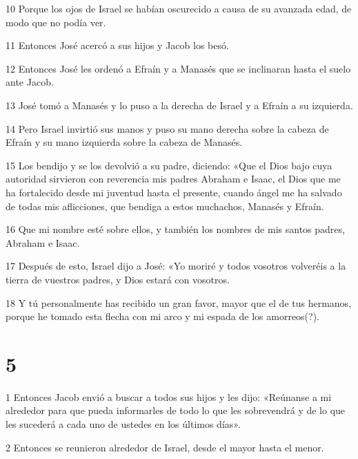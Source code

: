 \par 10 Porque los ojos de Israel se habían oscurecido a causa de su avanzada edad, de modo que no podía ver.

\par 11 Entonces José acercó a sus hijos y Jacob los besó.

\par 12 Entonces José les ordenó a Efraín y a Manasés que se inclinaran hasta el suelo ante Jacob.

\par 13 José tomó a Manasés y lo puso a la derecha de Israel y a Efraín a su izquierda.

\par 14 Pero Israel invirtió sus manos y puso su mano derecha sobre la cabeza de Efraín y su mano izquierda sobre la cabeza de Manasés.

\par 15 Los bendijo y se los devolvió a su padre, diciendo: «Que el Dios bajo cuya autoridad sirvieron con reverencia mis padres Abraham e Isaac, el Dios que me ha fortalecido desde mi juventud hasta el presente, cuando ángel me ha salvado de todas mis aflicciones, que bendiga a estos muchachos, Manasés y Efraín.

\par 16 Que mi nombre esté sobre ellos, y también los nombres de mis santos padres, Abraham e Isaac.

\par 17 Después de esto, Israel dijo a José: «Yo moriré y todos vosotros volveréis a la tierra de vuestros padres, y Dios estará con vosotros.

\par 18 Y tú personalmente has recibido un gran favor, mayor que el de tus hermanos, porque he tomado esta flecha con mi arco y mi espada de los amorreos(?).

\chapter{5}

\par 1 Entonces Jacob envió a buscar a todos sus hijos y les dijo: «Reúnanse a mi alrededor para que pueda informarles de todo lo que les sobrevendrá y de lo que les sucederá a cada uno de ustedes en los últimos días».

\par 2 Entonces se reunieron alrededor de Israel, desde el mayor hasta el menor.

